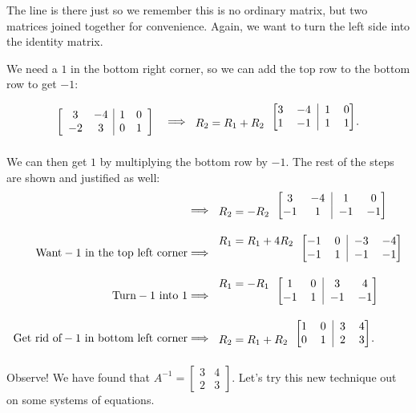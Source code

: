 \documentclass[../gatm.tex]{subfiles}
\begin{document}
The line is there just so we remember this is no ordinary matrix, but two matrices joined together for convenience. Again, we want to turn the left side into the identity matrix.

We need a $1$ in the bottom right corner, so we can add the top row to the bottom row to get $-1$:

$$\left[\begin{array}{cc|cc} 3 & -4 & 1 & 0 \\ -2 & 3 & 0 & 1 \end{array}\right]\quad\Longrightarrow
\begin{blockarray}{c[cc|cc]}
& 3 & -4 & 1 & 0 \\ 
R_2=R_1+R_2 & 1 & -1 & 1 & 1
\end{blockarray}.$$

We can then get $1$ by multiplying the bottom row by $-1$. The rest of the steps are shown and justified as well:
\begin{align*}
&\Longrightarrow
\begin{blockarray}{c[cc|cc]}
& 3 & -4 & 1 & 0 \\ 
R_2=-R_2 & -1 & 1 & -1 & -1
\end{blockarray} \\
\text{Want}-1\text{ in the top left corner} &\Longrightarrow
\begin{blockarray}{c[cc|cc]}
R_1=R_1+4R_2 & -1 & 0 & -3 & -4 \\ 
& -1 & 1 & -1 & -1
\end{blockarray} \\
\text{Turn}-1\text{ into }1 &\Longrightarrow
\begin{blockarray}{c[cc|cc]}
R_1=-R_1 & 1 & 0 & 3 & 4 \\ 
& -1 & 1 & -1 & -1
\end{blockarray} \\
\text{Get rid of}-1\text{ in bottom left corner}&\Longrightarrow
\begin{blockarray}{c[cc|cc]}
& 1 & 0 & 3 & 4 \\ 
R_2=R_1+R_2 & 0 & 1 & 2 & 3
\end{blockarray}. \\
\end{align*}
Observe! We have found that $A^{-1}=\left[\begin{smallmatrix}3 & 4 \\ 2 & 3 \end{smallmatrix}\right]$. Let's try this new technique out on some systems of equations.
\end{document}
